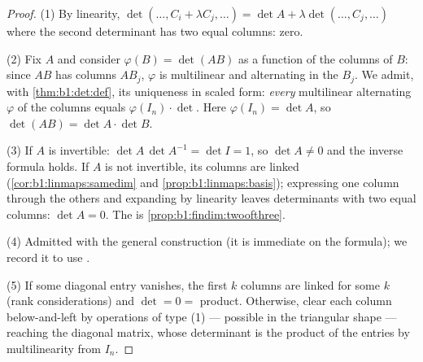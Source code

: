 \begin{proof}
(1) By linearity, $\det(\dots, C_i + \lambda C_j, \dots) = \det A +
\lambda\det(\dots, C_j, \dots)$ where the second determinant has two
equal columns: zero.

(2) Fix $A$ and consider $\varphi(B) = \det(AB)$ as a function of
the columns of $B$: since $AB$ has columns $AB_j$, $\varphi$ is
multilinear and alternating in the $B_j$. We admit, with
\cref{thm:b1:det:def}, its uniqueness  in scaled form:
\emph{every} multilinear alternating  $\varphi$ of the columns
equals $\varphi(I_n) \cdot \det$. Here $\varphi(I_n) = \det A$, so
$\det(AB) = \det A \cdot \det B$.

(3) If $A$ is invertible: $\det A\,\det A^{-1} = \det I = 1$, so
$\det A \neq 0$ and the inverse formula holds. If $A$ is not
invertible, its columns are linked (\cref{cor:b1:linmaps:samedim}
and \cref{prop:b1:linmaps:basis}); expressing one column through
the others and expanding by linearity leaves determinants with two
equal columns: $\det A = 0$. The   is
\cref{prop:b1:findim:twoofthree}.

(4) Admitted with the general construction (it is immediate on the
 formula); we record it to use .

(5) If some diagonal entry vanishes, the first $k$ columns are
linked for some $k$ (rank considerations) and $\det = 0 = $ product.
Otherwise, clear each column below-and-left by operations of type
(1) --- possible in the triangular shape --- reaching the diagonal
matrix, whose determinant is the product of the entries by
multilinearity from $I_n$.
\end{proof}

